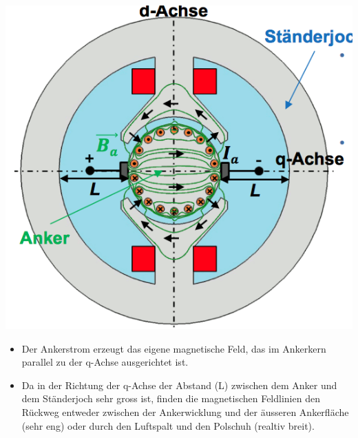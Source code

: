 \begin{minipage}{0.4 \linewidth}
\includegraphics[width = \linewidth]{./Pics/VL45/Ankerruek3}
\end{minipage}
\begin{minipage}{0.6 \linewidth}
\begin{itemize}
\item Der Ankerstrom erzeugt das eigene magnetische Feld, das im Ankerkern parallel zu der q-Achse ausgerichtet ist. 
\item Da in der Richtung der q-Achse der Abstand (L) zwischen dem Anker und dem Ständerjoch sehr gross ist, finden die magnetischen Feldlinien den Rückweg entweder zwischen der Ankerwicklung und der äusseren Ankerfläche (sehr eng) oder durch den Luftspalt und den Polschuh (realtiv breit).
\end{itemize}
\end{minipage}

